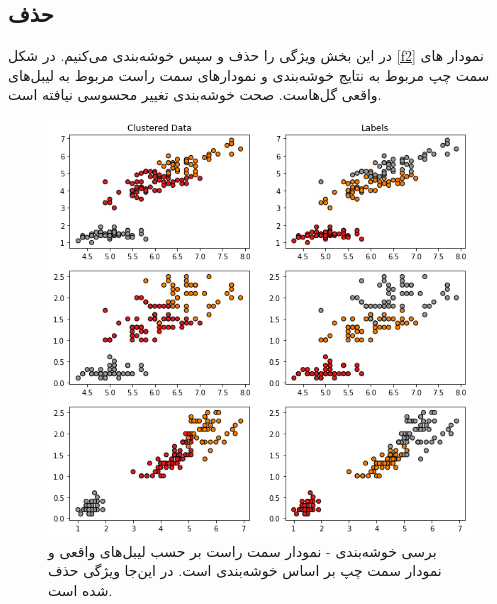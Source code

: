 \documentclass[a4paper]{article}
\begin{document}
\begin{large}
\subsection{حذف 
}
در این بخش ویژگی 
را حذف و سپس خوشه‌بندی می‌کنیم.
در شکل
\eqref{f2}
نمودار های سمت چپ مربوط به نتایج خوشه‌بندی و نمودار‌های سمت  راست مربوط به لیبل‌های واقعی گل‌هاست. صحت خوشه‌بندی تغییر محسوسی نیافته است.
\begin{figure}[h!]
	\centering
	\includegraphics[scale=0.6]{f2.png}
	\caption{برسی خوشه‌بندی - نمودار سمت راست بر حسب لیبل‌های واقعی و نمودار سمت چپ بر اساس خوشه‌بندی 
		است. در این‌جا ویژگی  
		حذف شده است.
	}
	\label{f2}
\end{figure}
\newpage

\end{large}
\end{document}
